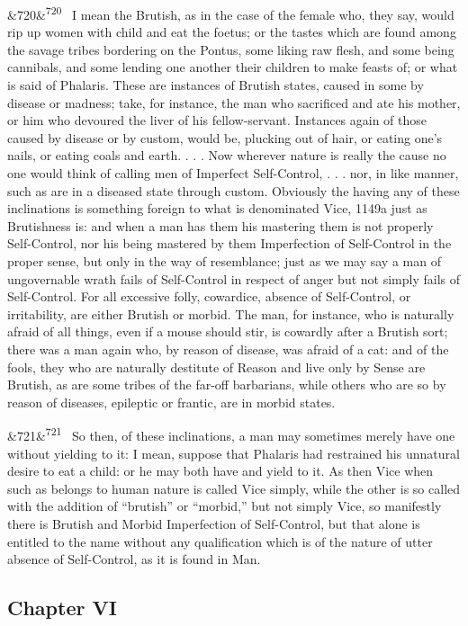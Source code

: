 \documentclass[12pt]{article}
\newcommand{\para}[1][]{\par\noindent\ifx&#1&\else\textsuperscript{\footnotesize #1}~\fi}
\begin{document}
\para[720] I mean the Brutish, as in the case of the female who, they say, would rip up women with child and eat the foetus; or the tastes which are found among the savage tribes bordering on the Pontus, some liking raw flesh, and some being cannibals, and some lending one another their children to make feasts of; or what is said of Phalaris. These are instances of Brutish states, caused in some by disease or madness; take, for instance, the man who sacrificed and ate his mother, or him who devoured the liver of his fellow-servant. Instances again of those caused by disease or by custom, would be, plucking out of hair, or eating one's nails, or eating coals and earth. . . . Now wherever nature is really the cause no one would think of calling men of Imperfect Self-Control, . . . nor, in like manner, such as are in a diseased state through custom. Obviously the having any of these inclinations is something foreign to what is denominated Vice, 1149a just as Brutishness is: and when a man has them his mastering them is not properly Self-Control, nor his being mastered by them Imperfection of Self-Control in the proper sense, but only in the way of resemblance; just as we may say a man of ungovernable wrath fails of Self-Control in respect of anger but not simply fails of Self-Control. For all excessive folly, cowardice, absence of Self-Control, or irritability, are either Brutish or morbid. The man, for instance, who is naturally afraid of all things, even if a mouse should stir, is cowardly after a Brutish sort; there was a man again who, by reason of disease, was afraid of a cat: and of the fools, they who are naturally destitute of Reason and live only by Sense are Brutish, as are some tribes of the far-off barbarians, while others who are so by reason of diseases, epileptic or frantic, are in morbid states.

\para[721] So then, of these inclinations, a man may sometimes merely have one without yielding to it: I mean, suppose that Phalaris had restrained his unnatural desire to eat a child: or he may both have and yield to it. As then Vice when such as belongs to human nature is called Vice simply, while the other is so called with the addition of “brutish” or “morbid,” but not simply Vice, so manifestly there is Brutish and Morbid Imperfection of Self-Control, but that alone is entitled to the name without any qualification which is of the nature of utter absence of Self-Control, as it is found in Man.

\subsection*{Chapter VI}
\end{document}
